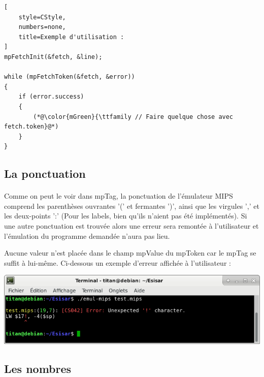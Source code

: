 \documentclass[12pt]{report} %
\begin{document}
\begin{lstlisting}[
    style=CStyle,
    numbers=none,
    title=Exemple d'utilisation :
]
mpFetchInit(&fetch, &line);

while (mpFetchToken(&fetch, &error))
{
    if (error.success)
    {
        (*@\color{mGreen}{\ttfamily // Faire quelque chose avec fetch.token}@*)
    }
}
\end{lstlisting}

    \subsection{La ponctuation}
    \paragraph{}
    Comme on peut le voir dans {\ttfamily mpTag}, la ponctuation de l'émulateur {\ttfamily MIPS} comprend les parenthèses ouvrantes '{\ttfamily (}' et fermantes '{\ttfamily )}', ainsi que les virgules '{\ttfamily ,}' et les deux-points '{\ttfamily :}' (Pour les labels, bien qu'ils n'aient pas été implémentés). Si une autre ponctuation est trouvée alors une erreur sera remontée à l'utilisateur et l'émulation du programme demandée n'aura pas lieu.

    Aucune valeur n'est placée dans le champ {\ttfamily mpValue} du {\ttfamily mpToken} car le {\ttfamily mpTag} se suffit à lui-même. Ci-dessous un exemple d'erreur affichée à l'utilisateur :

    \begin{center}
        \includegraphics[width=\textwidth]{MIPS-mpToken-ponctuation.png}
    \end{center}

    \subsection{Les nombres}
\end{document}
